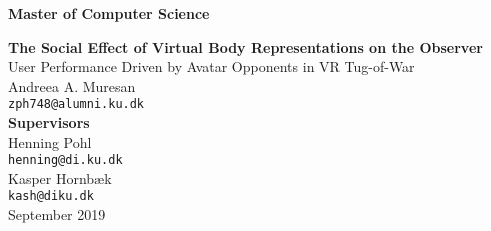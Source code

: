\documentclass[12pt,a4paper,oneside]{article}
\begin{document}
\raggedbottom
    \thispagestyle{empty}
 
    \vspace*{-1cm}
    \begin{center}
        \textbf{\Large Master of Computer Science} \\
    \end{center}
    \vspace*{5cm} 
    \begin{center}
    \textbf{\Huge The Social Effect of Virtual Body Representations on the
Observer} \\
    \vspace*{1cm} 
    {\Large User Performance Driven by Avatar Opponents in VR Tug-of-War} \\
      \vspace*{1cm} 
    Andreea A. Muresan \\
    \texttt{zph748@alumni.ku.dk} \\
     \vspace*{1cm} 
    \textbf{\large Supervisors} \\
         \vspace*{0.2cm} 
    Henning Pohl  \\
    \texttt{henning@di.ku.dk} \\
         \vspace*{0.2cm} 
    Kasper Hornbæk \\
    \texttt{kash@diku.dk} \\
       \vspace*{1cm} 
   September 2019
   
 \end{center}
\newpage
\ClearWallPaper

\tableofcontents
{}
\newpage
\ClearWallPaper














\medskip



\end{document}
